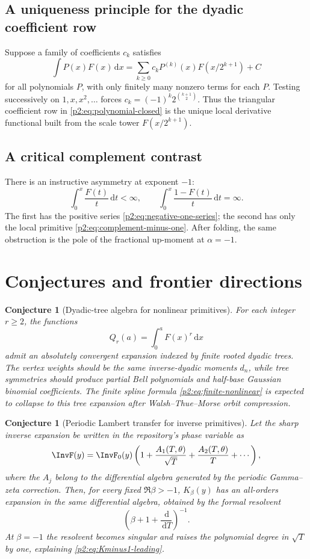 \documentclass[11pt,oneside]{article}
\newtheorem{conjecture}[theorem]{Conjecture}
\theoremstyle{definition}
\theoremstyle{remark}
\newcommand{\dd}{\,\mathrm d}
\newcommand{\1}{\mathbf 1}
\begin{document}
\subsection{A uniqueness principle for the dyadic coefficient row}
Suppose a family of coefficients $c_k$ satisfies
\[
 \int P(x)F(x)\dd x=\sum_{k\ge0}c_kP^{(k)}(x)F(x/2^{k+1})+C
\]
for all polynomials $P$, with only finitely many nonzero terms for each $P$.
Testing successively on $1,x,x^2,\ldots$ forces
$c_k=(-1)^k2^{\binom{k+1}{2}}$.  Thus the triangular coefficient row in
\eqref{p2:eq:polynomial-closed} is the unique local derivative functional built
from the scale tower $F(x/2^{k+1})$.

\subsection{A critical complement contrast}
There is an instructive asymmetry at exponent $-1$:
\begin{equation}
 \int_0^x\frac{F(t)}t\dd t<\infty,
 \qquad
 \int_0^x\frac{1-F(t)}t\dd t=\infty.                      \label{p2:eq:critical-contrast}
\end{equation}
The first has the positive series \eqref{p2:eq:negative-one-series}; the second
has only the local primitive \eqref{p2:eq:complement-minus-one}.  After folding,
the same obstruction is the pole of the fractional up-moment at
$\alpha=-1$.

\section{Conjectures and frontier directions}
\label{p2:sec:conjectures}

\begin{conjecture}[Dyadic-tree algebra for nonlinear primitives]
\label{p2:conj:nonlinear-tree}
For each integer $r\ge2$, the functions
\[
 Q_r(a)=\int_0^aF(x)^r\dd x
\]
admit an absolutely convergent expansion indexed by finite rooted dyadic trees.
The vertex weights should be the same inverse-dyadic moments $d_n$, while tree
symmetries should produce partial Bell polynomials and half-base Gaussian
binomial coefficients.  The finite spline formula
\eqref{p2:eq:finite-nonlinear} is expected to collapse to this tree expansion
after Walsh--Thue--Morse orbit compression.
\end{conjecture}

\begin{conjecture}[Periodic Lambert transfer for inverse primitives]
\label{p2:conj:periodic-transfer}
Let the sharp inverse expansion be written in the repository's phase variable as
\[
 \InvF(y)=\InvF_0(y)\left(1+\frac{A_1(T,\theta)}{\sqrt T}
 +\frac{A_2(T,\theta)}T+\cdots\right),
\]
where the $A_j$ belong to the differential algebra generated by the periodic
Gamma--zeta correction.  Then, for every fixed $\Re\beta>-1$, $K_\beta(y)$ has
an all-orders expansion in the same differential algebra, obtained by the
formal resolvent
\[
 \left(\beta+1+\frac{\dd}{\dd T}\right)^{-1}.
\]
At $\beta=-1$ the resolvent becomes singular and raises the polynomial degree in
$\sqrt T$ by one, explaining \eqref{p2:eq:Kminus1-leading}.
\end{conjecture}
\end{document}
